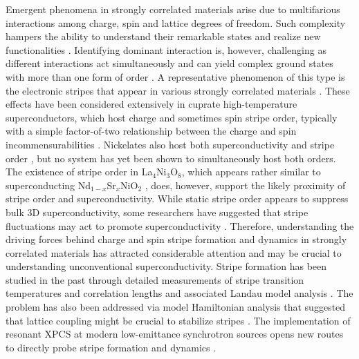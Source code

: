 \documentclass[aps,prl,showpacs,floatfix,twocolumn,superscriptaddress,longbibliography]{revtex4-1}
\begin{document}
Emergent phenomena in strongly correlated materials arise due to multifarious interactions among charge, spin and lattice degrees of freedom. Such complexity hampers the ability to understand their remarkable states and realize new functionalities \cite{Chumak2015spintronics}. Identifying dominant interaction is, however, challenging as different interactions act simultaneously and can yield complex ground states with more than one form of order \cite{Fradkin2015}. A representative phenomenon of this type is the electronic stripes that appear in various strongly correlated materials \cite{Mori1998LMO, Lee2006review, Ulbrich2012review, Comin2016review}. These effects have been considered extensively in cuprate high-temperature superconductors, which host charge and sometimes spin stripe order, typically with a simple factor-of-two relationship between the charge and spin incommensurabilities  \cite{Tranquada1995cuprate, Mook2000YBCO, Hoffman2002Bi2212}. Nickelates also host both superconductivity and stripe order \cite{Tranquada1994LNO, Tranquada1996LSNO, Li2019Nisuperconductor}, but no system has yet been shown to simultaneously host both orders. The existence of stripe order in La$_4$Ni$_3$O$_8$, which appears rather similar to superconducting Nd$_{1-x}$Sr$_x$NiO$_2$ \cite{Zhang2016LaNiO438, Zhang2017Ni438, Zhang2019LaNiO438, Lin2020strong}, does, however, support the likely proximity of stripe order and superconductivity. While static stripe order appears to suppress bulk 3D superconductivity, some researchers have suggested that stripe fluctuations may act to promote superconductivity \cite{Emery1997spin, Kivelson1998electronic, Agterberg2020PDW_review}. Therefore, understanding the driving forces behind charge and spin stripe formation and dynamics in strongly correlated materials has attracted considerable attention and may be crucial to understanding unconventional superconductivity. Stripe formation has been studied in the past through detailed measurements of stripe transition temperatures and correlation lengths \cite{Chen1993LSNO, Cheong1994LSNO, Lee1997LSNO, Yoshizawa2000LSNO, Lee2001LSNO, Kajimoto2001LSNO, Ghazi2004LSNO, Freeman2004LSNO, Raczkowski2006LSNO} and associated Landau model analysis \cite{Wochner1998LSNO, Zachar1998Landau}. The problem has also been addressed via model Hamiltonian analysis that suggested that lattice coupling might be crucial to stabilize stripes \cite{Zaanen1994freezing, Hotta2004LSNO}. The implementation of resonant \gls{XPCS} at modern low-emittance synchrotron sources opens new routes to directly probe stripe formation and dynamics \cite{Chen2016LBCO, Thampy2017LBCO, Chen2019LBCO, Ricci2019LSNO}. 
\end{document}

